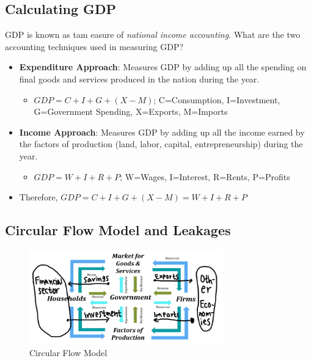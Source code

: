\documentclass[
  letterpaper,
  DIV=11,
  numbers=noendperiod]{scrartcl}
\providecommand{\tightlist}{%
  \setlength{\itemsep}{0pt}\setlength{\parskip}{0pt}}\usepackage{longtable,booktabs,array}
\begin{document}
\subsection{Calculating GDP}\label{calculating-gdp}

GDP is known as tam easure of \emph{national income accounting}. What
are the two accounting techniques used in measuring GDP?

\begin{itemize}
\tightlist
\item
  \textbf{Expenditure Approach}: Measures GDP by adding up all the
  spending on final goods and services produced in the nation during the
  year.

  \begin{itemize}
  \tightlist
  \item
    \(GDP = C + I + G + (X-M)\); C=Consumption, I=Investment,
    G=Government Spending, X=Exports, M=Imports
  \end{itemize}
\item
  \textbf{Income Approach}: Measures GDP by adding up all the income
  earned by the factors of production (land, labor, capital,
  entrepreneurship) during the year.

  \begin{itemize}
  \tightlist
  \item
    \(GDP = W + I + R + P\); W=Wages, I=Interest, R=Rents, P=Profits
  \end{itemize}
\item
  Therefore, \(GDP = C + I + G + (X-M) = W + I + R + P\)
\end{itemize}

\newpage{}

\subsection{Circular Flow Model and
Leakages}\label{circular-flow-model-and-leakages}

\begin{figure}[H]

{\centering \includegraphics[width=0.75\textwidth,height=\textheight]{img/circular-flow.png}

}

\caption{Circular Flow Model}

\end{figure}%
\end{document}
